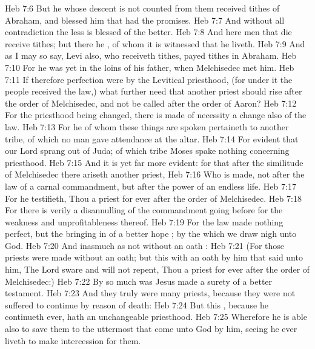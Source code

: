 \vs Heb 7:6 But he whose descent is not counted from them received tithes of Abraham, and blessed him that had the promises.
\vs Heb 7:7 And without all contradiction the less is blessed of the better.
\vs Heb 7:8 And here men that die receive tithes; but there he , of whom it is witnessed that he liveth.
\vs Heb 7:9 And as I may so say, Levi also, who receiveth tithes, payed tithes in Abraham.
\vs Heb 7:10 For he was yet in the loins of his father, when Melchisedec met him.
\vs Heb 7:11 If therefore perfection were by the Levitical priesthood, (for under it the people received the law,) what further need  that another priest should rise after the order of Melchisedec, and not be called after the order of Aaron?
\vs Heb 7:12 For the priesthood being changed, there is made of necessity a change also of the law.
\vs Heb 7:13 For he of whom these things are spoken pertaineth to another tribe, of which no man gave attendance at the altar.
\vs Heb 7:14 For  evident that our Lord sprang out of Juda; of which tribe Moses spake nothing concerning priesthood.
\vs Heb 7:15 And it is yet far more evident: for that after the similitude of Melchisedec there ariseth another priest,
\vs Heb 7:16 Who is made, not after the law of a carnal commandment, but after the power of an endless life.
\vs Heb 7:17 For he testifieth, Thou  a priest for ever after the order of Melchisedec.
\vs Heb 7:18 For there is verily a disannulling of the commandment going before for the weakness and unprofitableness thereof.
\vs Heb 7:19 For the law made nothing perfect, but the bringing in of a better hope ; by the which we draw nigh unto God.
\vs Heb 7:20 And inasmuch as not without an oath :
\vs Heb 7:21 (For those priests were made without an oath; but this with an oath by him that said unto him, The Lord sware and will not repent, Thou  a priest for ever after the order of Melchisedec:)
\vs Heb 7:22 By so much was Jesus made a surety of a better testament.
\vs Heb 7:23 And they truly were many priests, because they were not suffered to continue by reason of death:
\vs Heb 7:24 But this , because he continueth ever, hath an unchangeable priesthood.
\vs Heb 7:25 Wherefore he is able also to save them to the uttermost that come unto God by him, seeing he ever liveth to make intercession for them.
